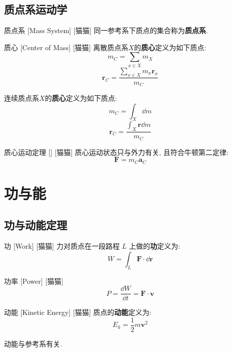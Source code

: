 \documentclass[UTF8]{ctexart}
\begin{document}
    \subsection{质点系运动学}
        
        \begin{dfn}
            []
            {质点系}
            [Mass System]
            [猫猫]
            同一参考系下质点的集合称为\textbf{质点系}. 
        \end{dfn}
        
        \begin{dfn}
            []
            {质心}
            [Center of Mass]
            [猫猫]
            离散质点系\(X\)的\textbf{质心}定义为如下质点: 
            \[m_C=\sum_{x\in X}m_X\]
            \[\bm{r}_C=\frac{\sum\limits_{x\in X}m_x\bm{r}_x}{m_C}\]

            连续质点系\(X\)的\textbf{质心}定义为如下质点:
            \[m_C=\int_X\dd m\]
            \[\bm{r}_C=\frac{\int_X\bm{r}\dd m}{m_C}\]
        \end{dfn}
        
        \begin{thm}
            []
            {质心运动定理}
            []
            [猫猫]
            质心运动状态只与外力有关, 且符合牛顿第二定律: 
            \[\bm{F}=m_C\bm{a}_C\]
        \end{thm}

\section{功与能}

    \subsection{功与动能定理}
        
        \begin{dfn}
            []
            {功}
            [Work]
            [猫猫]
            力对质点在一段路程 \(L\) 上做的\textbf{功}定义为: 
            \[W=\int_L\bm{F}\cdot\dd\bm{r}\]
        \end{dfn}
        
        \begin{dfn}
            []
            {功率}
            [Power]
            [猫猫]
            \[P=\frac{\dd W}{\dd t}=\bm{F}\cdot\bm{v}\]
        \end{dfn}
        
        \begin{dfn}
            []
            {动能}
            [Kinetic Energy]
            [猫猫]
            质点的\textbf{动能}定义为: 
            \[E_k=\frac{1}{2}m\bm{v}^2\]

            动能与参考系有关. 
        \end{dfn}
        
\end{document}
